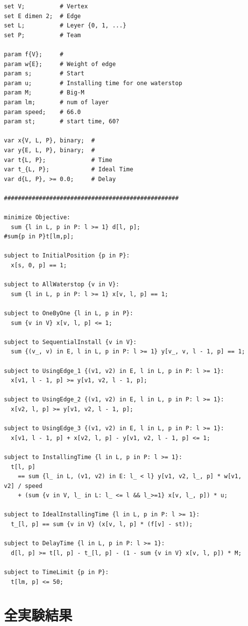 \documentclass[a4paper,12pt,fleqn]{jarticle}
\begin{document}
\begin{verbatim}
set V;          # Vertex
set E dimen 2;  # Edge
set L;          # Leyer {0, 1, ...}
set P;          # Team

param f{V};     #
param w{E};     # Weight of edge
param s;        # Start
param u;        # Installing time for one waterstop
param M;        # Big-M
param lm;       # num of layer
param speed;    # 66.0
param st;       # start time, 60?

var x{V, L, P}, binary;  #
var y{E, L, P}, binary;  #
var t{L, P};             # Time
var t_{L, P};            # Ideal Time
var d{L, P}, >= 0.0;     # Delay

##################################################

minimize Objective:
  sum {l in L, p in P: l >= 1} d[l, p];
#sum{p in P}t[lm,p];
   
subject to InitialPosition {p in P}:
  x[s, 0, p] == 1;

subject to AllWaterstop {v in V}:
  sum {l in L, p in P: l >= 1} x[v, l, p] == 1;

subject to OneByOne {l in L, p in P}:
  sum {v in V} x[v, l, p] <= 1;

subject to SequentialInstall {v in V}:
  sum {(v_, v) in E, l in L, p in P: l >= 1} y[v_, v, l - 1, p] == 1;

subject to UsingEdge_1 {(v1, v2) in E, l in L, p in P: l >= 1}:
  x[v1, l - 1, p] >= y[v1, v2, l - 1, p];

subject to UsingEdge_2 {(v1, v2) in E, l in L, p in P: l >= 1}:
  x[v2, l, p] >= y[v1, v2, l - 1, p];

subject to UsingEdge_3 {(v1, v2) in E, l in L, p in P: l >= 1}:
  x[v1, l - 1, p] + x[v2, l, p] - y[v1, v2, l - 1, p] <= 1;

subject to InstallingTime {l in L, p in P: l >= 1}:
  t[l, p]
    == sum {l_ in L, (v1, v2) in E: l_ < l} y[v1, v2, l_, p] * w[v1, v2] / speed
    + (sum {v in V, l_ in L: l_ <= l && l_>=1} x[v, l_, p]) * u;

subject to IdealInstallingTime {l in L, p in P: l >= 1}:
  t_[l, p] == sum {v in V} (x[v, l, p] * (f[v] - st));

subject to DelayTime {l in L, p in P: l >= 1}:
  d[l, p] >= t[l, p] - t_[l, p] - (1 - sum {v in V} x[v, l, p]) * M;

subject to TimeLimit {p in P}:
  t[lm, p] <= 50;
\end{verbatim}

\newpage

\section{全実験結果}
\end{document}
